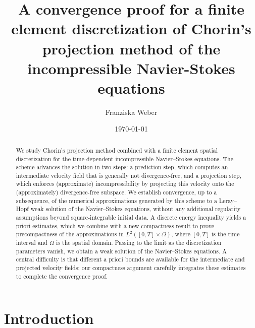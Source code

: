 \documentclass[10pt,letterpaper]{amsart}
\title[Convergence Projection Method]{A convergence proof for a  finite element discretization of Chorin's projection method of the incompressible Navier-Stokes equations}
\date{\today}
\author[F. Weber]{Franziska Weber}
\newcommand{\dom}{\Omega}
\theoremstyle{definition}{\newtheorem{definition}[lemma]{Definition}}
\numberwithin{equation}{section}
\begin{document}

\begin{abstract}
	We study Chorin’s projection method combined with a finite element spatial discretization for the time-dependent incompressible Navier–Stokes equations. The scheme advances the solution in two steps: a prediction step, which computes an intermediate velocity field that is generally not divergence-free, and a projection step, which enforces (approximate) incompressibility by projecting this velocity onto the (approximately) divergence-free subspace.
	We establish convergence, up to a subsequence, of the numerical approximations generated by this scheme to a Leray–Hopf weak solution of the Navier–Stokes equations, without any additional regularity assumptions beyond square-integrable initial data. A discrete energy inequality yields a priori estimates, which we combine with a new compactness result to prove precompactness of the approximations in $L^2([0,T]\times\dom)$, where $[0,T]$ is the time interval and $\dom$ is the spatial domain. Passing to the limit as the discretization parameters vanish, we obtain a weak solution of the Navier–Stokes equations.
	A central difficulty is that different a priori bounds are available for the intermediate and projected velocity fields; our compactness argument carefully integrates these estimates to complete the convergence proof.

\end{abstract}

\maketitle


\section{Introduction}
\end{document}

